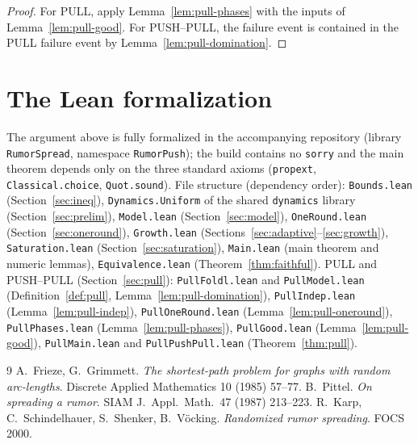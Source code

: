 \begin{proof}
  For PULL, apply Lemma~\ref{lem:pull-phases} with the inputs of
  Lemma~\ref{lem:pull-good}. For PUSH--PULL, the failure event is contained
  in the PULL failure event by Lemma~\ref{lem:pull-domination}.
\end{proof}

\section{The Lean formalization}\label{sec:lean}

The argument above is fully formalized in the accompanying repository
(library \texttt{RumorSpread}, namespace \texttt{RumorPush}); the build
contains no \texttt{sorry} and the main theorem depends only on the three
standard axioms (\texttt{propext}, \texttt{Classical.choice},
\texttt{Quot.sound}). File structure (dependency order):
\texttt{Bounds.lean} (Section~\ref{sec:ineq}), \texttt{Dynamics.Uniform}
of the shared \texttt{dynamics} library (Section~\ref{sec:prelim}), \texttt{Model.lean}
(Section~\ref{sec:model}), \texttt{OneRound.lean}
(Section~\ref{sec:oneround}), \texttt{Growth.lean}
(Sections~\ref{sec:adaptive}--\ref{sec:growth}), \texttt{Saturation.lean}
(Section~\ref{sec:saturation}), \texttt{Main.lean} (main theorem and
numeric lemmas), \texttt{Equivalence.lean} (Theorem~\ref{thm:faithful}).
PULL and PUSH--PULL (Section~\ref{sec:pull}): \texttt{PullFoldl.lean} and
\texttt{PullModel.lean} (Definition~\ref{def:pull},
Lemma~\ref{lem:pull-domination}), \texttt{PullIndep.lean}
(Lemma~\ref{lem:pull-indep}), \texttt{PullOneRound.lean}
(Lemma~\ref{lem:pull-oneround}), \texttt{PullPhases.lean}
(Lemma~\ref{lem:pull-phases}), \texttt{PullGood.lean}
(Lemma~\ref{lem:pull-good}), \texttt{PullMain.lean} and
\texttt{PullPushPull.lean} (Theorem~\ref{thm:pull}).

\begin{thebibliography}{9}
 A.~Frieze, G.~Grimmett.
\emph{The shortest-path problem for graphs with random arc-lengths}.
Discrete Applied Mathematics 10 (1985) 57--77.
 B.~Pittel.
\emph{On spreading a rumor}. SIAM J.\ Appl.\ Math.\ 47 (1987) 213--223.
 R.~Karp, C.~Schindelhauer, S.~Shenker, B.~V\"ocking.
\emph{Randomized rumor spreading}. FOCS 2000.
\end{thebibliography}
